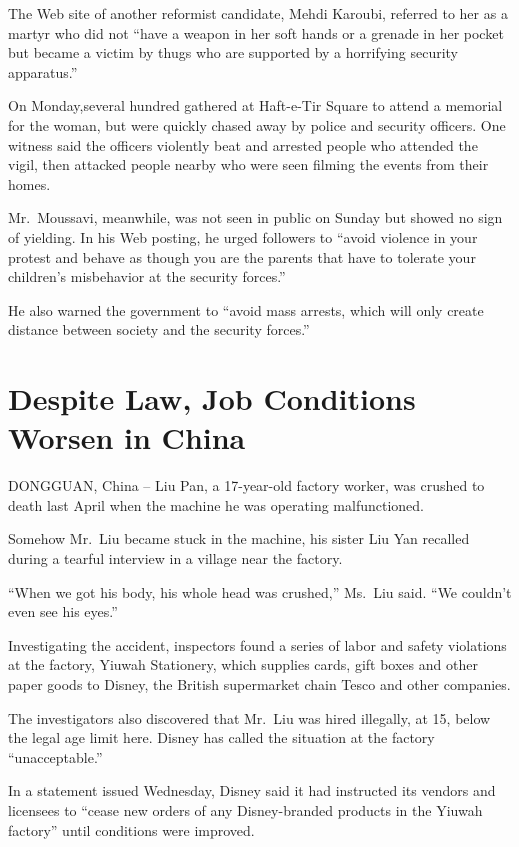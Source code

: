 ﻿\documentclass[12pt,a4paper,onecolumn]{article}
\begin{document}
The Web site of another reformist candidate, Mehdi Karoubi, referred to her as a martyr who did not
``have a weapon in her soft hands or a grenade in her pocket but became a victim by thugs who are
supported by a horrifying security apparatus.''

On Monday,several hundred gathered at Haft-e-Tir Square to attend a memorial for the woman, but were
quickly chased away by police and security officers. One witness said the officers violently beat
and arrested people who attended the vigil, then attacked people nearby who were seen filming the
events from their homes.

Mr.~Moussavi, meanwhile, was not seen in public on Sunday but showed no sign of yielding. In his Web
posting, he urged followers to ``avoid violence in your protest and behave as though you are the
parents that have to tolerate your children's misbehavior at the security forces.''

He also warned the government to ``avoid mass arrests, which will only create distance between
society and the security forces.''

\section{Despite Law, Job Conditions Worsen in China}

DONGGUAN, China -- Liu Pan, a 17-year-old factory worker, was crushed to death last April when the
machine he was operating malfunctioned.

Somehow Mr.~Liu became stuck in the machine, his sister Liu Yan recalled during a tearful interview
in a village near the factory.

``When we got his body, his whole head was crushed,'' Ms.~Liu said. ``We couldn't even see his
eyes.''

Investigating the accident, inspectors found a series of labor and safety violations at the factory,
Yiuwah Stationery, which supplies cards, gift boxes and other paper goods to Disney, the British
supermarket chain Tesco and other companies.

The investigators also discovered that Mr.~Liu was hired illegally, at 15, below the legal age limit
here. Disney has called the situation at the factory ``unacceptable.''

In a statement issued Wednesday, Disney said it had instructed its vendors and licensees to ``cease
new orders of any Disney-branded products in the Yiuwah factory'' until conditions were improved.
\end{document}
